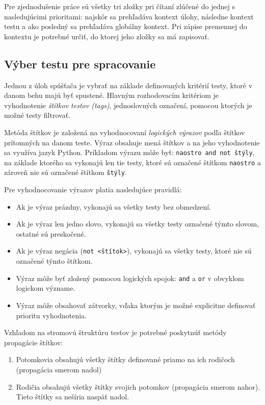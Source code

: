 \documentclass[
  digital, %
  oneside, %
  table,   %
  lof,     %
  lot,   %
]{fithesis3}
\begin{document}
Pre zjednodušenie práce sú všetky tri zložky pri čítaní zlúčené do jednej s nasledujúcimi prioritami: najskôr sa prehľadáva kontext úlohy, následne kontext testu a ako posledný sa prehľadáva globálny kontext. Pri zápise premennej do kontextu je potrebné určiť, do ktorej jeho zložky sa má zapisovať. 

\subsection{Výber testu pre spracovanie}

Jednou z úloh spúšťača je vybrať na základe definovaných kritérií testy, ktoré v danom behu majú byť spustené. Hlavným rozhodovacím kritériom je vyhodnotenie \emph{štítkov testov (tags)}, jednoslovných označení, pomocou ktorých je možné testy filtrovať.

Metóda štítkov je založená na vyhodnocovaní \emph{logických výrazov} podľa štítkov prítomných na danom teste. Výraz obsahuje mená štítkov a na jeho vyhodnotenie sa využíva jazyk Python. Príkladom výrazu môže byť: \texttt{naostro and not štýly}, na základe ktorého sa vykonajú len tie testy, ktoré sú označené štítkom \texttt{naostro} a zároveň nie sú označené štítkom \texttt{štýly}. 

Pre vyhodnocovanie výrazov platia nasledujúce pravidlá:
\begin{itemize}
    \item Ak je výraz prázdny, vykonajú sa všetky testy bez obmedzení.
    \item Ak je výraz len jedno slovo, vykonajú sa všetky testy označené týmto slovom, ostatné sú preskočené.
    \item Ak je výraz negácia (\texttt{not <štítok>}), vykonajú sa všetky testy, ktoré nie sú označené týmto štítkom.
    \item Výraz môže byť zložený pomocou logických spojok: \texttt{and} a \texttt{or} v obvyklom logickom význame.
    \item Výraz môže obsahovať zátvorky, vďaka ktorým je možné explicitne definovať prioritu vyhodnotenia. 
\end{itemize}

Vzhľadom na stromovú štruktúru testov je potrebné poskytnúť metódy propagácie štítkov:
\begin{enumerate}
    \item Potomkovia obsahujú všetky štítky definované priamo na ich rodičoch (propagácia smerom nadol)
    \item Rodičia obsahujú všetky štítky svojich potomkov (propagácia smerom nahor). Tieto štítky sa nešíria naspäť nadol.
\end{enumerate}
\end{document}
